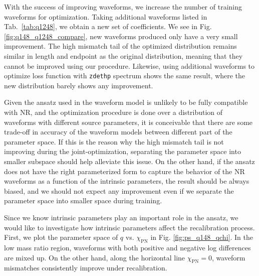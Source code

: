 \documentclass[twocolumn]{aastex631}
\newcommand{\zdethp}{\texttt{zdethp}}
\begin{document}
With the success of improving waveforms, we increase the number of training waveforms for optimization. Taking additional waveforms listed in Tab.~\ref{tab:q1248}, we obtain a new set of coefficients. We see in Fig. \ref{fig:q148_q1248_compare}, new waveforms produced only have a very small improvement. The high mismatch tail of the optimized distribution remains similar in length and endpoint as the original distribution, meaning that they cannot be improved using our procedure. Likewise, using additional waveforms to optimize loss function with {\zdethp} spectrum shows the same result, where the new distribution barely shows any improvement. 


Given the ansatz used in the waveform model is unlikely to be fully compatible with NR, and the optimization procedure is done over a distribution of waveforms with different source parameters, it is conceivable that there are some trade-off in accuracy of the waveform models between different part of the parameter space. If this is the reason why the high mismatch tail is not improving during the joint-optimization, separating the parameter space into smaller subspace should help alleviate this issue. On the other hand, if the ansatz does not have the right parameterized form to capture the behavior of the NR waveforms as a function of the intrinsic parameters, the result should be always biased, and we should not expect any improvement even if we separate the parameter space into smaller space during training.

Since we know intrinsic parameters play an important role in the ansatz, we would like to investigate how intrinsic parameters affect the recalibration process. First, we plot the parameter space of $q$ vs. $\chi_{\mathrm{PN}}$ in Fig. \ref{fig:ps_q148_qchi}. In the low mass ratio region, waveforms with both positive and negative log differences are mixed up. On the other hand, along the horizontal line $\chi_{\mathrm{PN}}=0$, waveform mismatches consistently improve under recalibration. 
\end{document}
